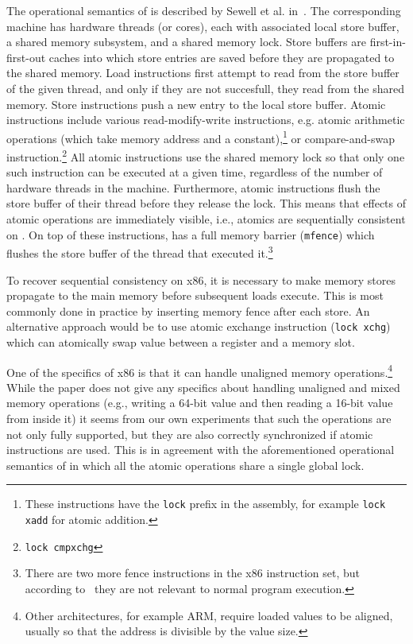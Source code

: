 The operational semantics of \xtso is described by Sewell et al. in~\cite{x86tso}.
The corresponding machine has hardware threads (or cores), each with associated local store buffer, a shared memory subsystem, and a shared memory lock.
Store buffers are first-in-first-out caches into which store entries are saved before they are propagated to the shared memory.
Load instructions first attempt to read from the store buffer of the given
thread, and only if they are not succesfull, they read from the shared memory.
Store instructions push a new entry to the local store buffer.
Atomic instructions include various read-modify-write instructions, e.g. atomic
arithmetic operations (which take memory address and a constant),\footnote{These
  instructions have the \texttt{lock} prefix in the assembly, for example
  \texttt{lock xadd} for atomic addition.}
or compare-and-swap instruction.\footnote{\texttt{lock cmpxchg}}
All atomic instructions use the shared memory lock so that only one such instruction can be executed at a given time, regardless of the number of hardware threads in the machine.
Furthermore, atomic instructions flush the store buffer of their thread before they release the lock.
This means that effects of atomic operations are immediately visible, i.e., atomics are sequentially consistent on \xtso.
On top of these instructions, \xtso has a full memory barrier (\texttt{mfence}) which flushes the store buffer of the thread that executed it.\footnote{There are two more fence instructions in the x86 instruction set, but according to~\cite{x86tso} they are not relevant to normal program execution.}

To recover sequential consistency on x86, it is necessary to make memory stores propagate to the main memory before subsequent loads execute.
This is most commonly done in practice by inserting memory fence after each store.
An alternative approach would be to use atomic exchange instruction
(\texttt{lock xchg}) which can atomically swap value between a register and a
memory slot.

One of the specifics of x86 is that it can handle unaligned memory operations.\footnote{Other architectures, for example ARM, require loaded values to be aligned, usually so that the address is divisible by the value size.}
While the \xtso paper does not give any specifics about handling unaligned and
mixed memory operations (e.g., writing a 64-bit value and then reading a 16-bit
value from inside it) it seems from our own experiments that such the operations
are not only fully supported, but they are also correctly synchronized if atomic instructions are used.
This is in agreement with the aforementioned operational semantics of \xtso in
which all the atomic operations share a single global lock.


